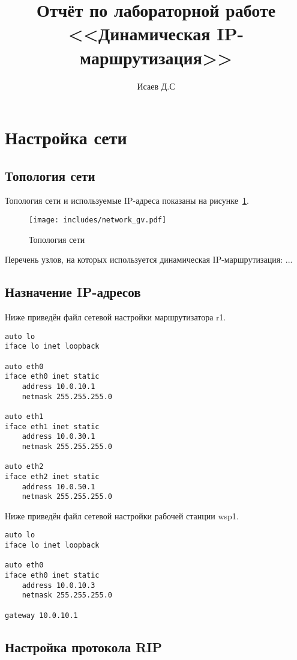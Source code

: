 \documentclass[a4paper,12pt]{article}
\title{Отчёт по лабораторной работе \\ <<Динамическая IP-маршрутизация>>}
\author{Исаев Д.С}
\begin{document}
\maketitle

\tableofcontents

\section{Настройка сети}

\subsection{Топология сети}

Топология сети и используемые IP-адреса показаны на рисунке~\ref{fig:network}.

\begin{figure}
\centering
\texttt{[image: includes/network\_gv.pdf]}
\caption{Топология сети}
\label{fig:network}
\end{figure}

Перечень узлов, на которых используется динамическая IP-маршрутизация: ...


\subsection{Назначение IP-адресов}

Ниже приведён файл сетевой настройки  маршрутизатора r1.

\begin{Verbatim}
auto lo
iface lo inet loopback

auto eth0
iface eth0 inet static
    address 10.0.10.1
    netmask 255.255.255.0

auto eth1
iface eth1 inet static
    address 10.0.30.1
    netmask 255.255.255.0

auto eth2
iface eth2 inet static
    address 10.0.50.1
    netmask 255.255.255.0
\end{Verbatim}

Ниже приведён файл сетевой настройки рабочей станции wsp1.

\begin{Verbatim}
auto lo
iface lo inet loopback

auto eth0
iface eth0 inet static
    address 10.0.10.3
    netmask 255.255.255.0

gateway 10.0.10.1
\end{Verbatim}


\subsection{Настройка протокола RIP}
\end{document}
